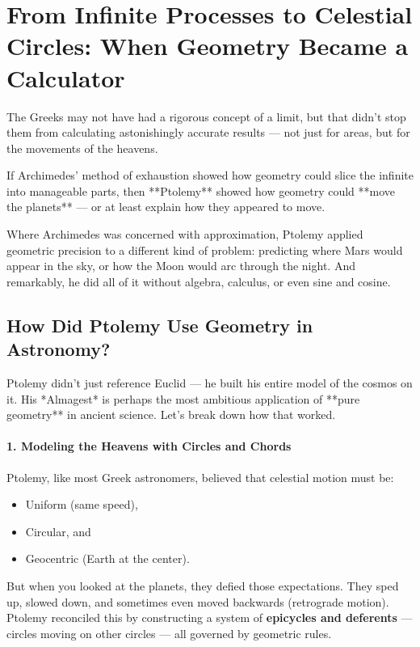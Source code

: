 \section{From Infinite Processes to Celestial Circles: When Geometry Became a Calculator}

The Greeks may not have had a rigorous concept of a limit, but that didn’t stop them from calculating astonishingly accurate results — not just for areas, but for the movements of the heavens.

If Archimedes’ method of exhaustion showed how geometry could slice the infinite into manageable parts, then **Ptolemy** showed how geometry could **move the planets** — or at least explain how they appeared to move.

Where Archimedes was concerned with approximation, Ptolemy applied geometric precision to a different kind of problem: predicting where Mars would appear in the sky, or how the Moon would arc through the night. And remarkably, he did all of it without algebra, calculus, or even sine and cosine.

\subsection{How Did Ptolemy Use Geometry in Astronomy?}

Ptolemy didn’t just reference Euclid — he built his entire model of the cosmos on it. His *Almagest* is perhaps the most ambitious application of **pure geometry** in ancient science. Let’s break down how that worked.

\paragraph{1. Modeling the Heavens with Circles and Chords}

Ptolemy, like most Greek astronomers, believed that celestial motion must be:
\begin{itemize}
    \item Uniform (same speed),
    \item Circular, and
    \item Geocentric (Earth at the center).
\end{itemize}

But when you looked at the planets, they defied those expectations. They sped up, slowed down, and sometimes even moved backwards (retrograde motion). Ptolemy reconciled this by constructing a system of \textbf{epicycles and deferents} — circles moving on other circles — all governed by geometric rules.

